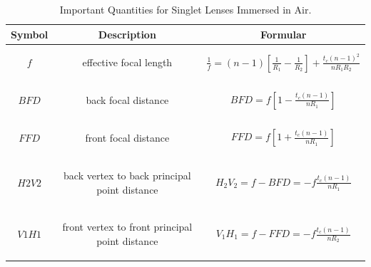 \begin{table}
\centering
\caption{Important Quantities for Singlet Lenses Immersed in Air\cite{lens_theory_LC_Ltd}.}
\begin{tabular}{|c|c|c|}
\hline
\textbf{Symbol}&\textbf{Description}&\textbf{Formular}\\
\hline
$f$ & \parbox[c]{6cm}{
						\begin{center}
						effective focal length
						\end{center}
				}& $\frac{1}{f}=(n-1)\left[\frac{1}{R_{1}}-\frac{1}{R_{2}} \right]+\frac{t_{c}(n-1)^2}{nR_{1}R_{2}}$ \\
\hline
$BFD$ &\parbox[c]{6cm}{
						\begin{center}
						back focal distance 
						\end{center}
			}& $BFD=f\left[ 1-\frac{t_{c}(n-1)}{nR_{1}}\right]$ \\
\hline
$FFD$ &\parbox[c]{6cm}{
						\begin{center}
						 front focal distance
						 \end{center} 
			}& $FFD=f\left[ 1+\frac{t_{c}(n-1)}{nR_{1}}\right]$ \\
\hline
$H2V2$ & \parbox[c]{6cm}{
						\begin{center}
						back vertex to back principal point distance
						\end{center}						
			} & $H_{2}V_{2}=f-BFD=-f\frac{t_{c}(n-1)}{nR_{1}}$ \\
\hline
$V1H1$ & \parbox[c]{6cm}{
						\begin{center}			
				    front vertex to front principal point distance
				    \end{center}
				 } & $V_{1}H_{1}=f-FFD=-f\frac{t_{c}(n-1)}{nR_{2}}$ \\
\hline
\end{tabular}
\label{tab:lens_quantities}
\end{table}

